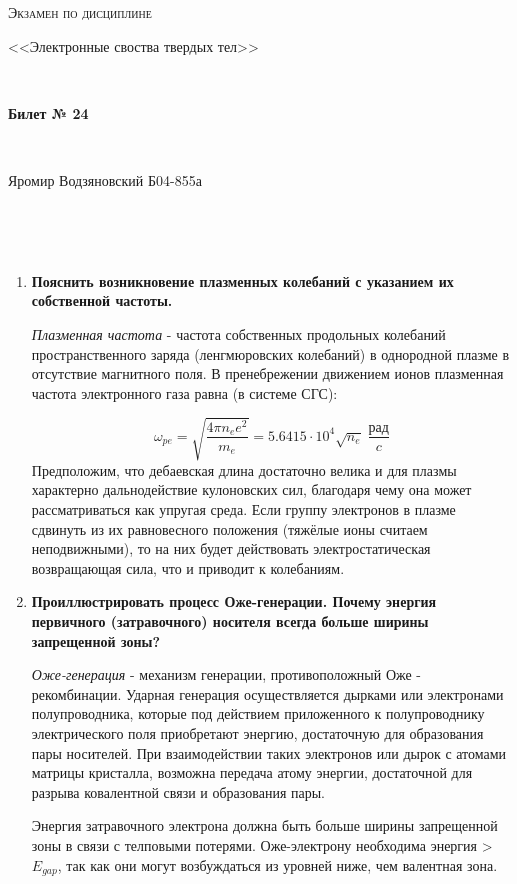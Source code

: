 \documentclass[a4paper]{article}
\begin{document}
\graphicspath{ {pictures/} }
\begin{center}
    {\scshape\Large Экзамен по дисциплине \par <<Электронные своства твердых тел>>} \par

    \

    {\huge\bfseries Билет № 24} \par 

    \

    {\large Яромир Водзяновский Б04-855а}
\end{center}

\

\

\begin{enumerate}
    \item \textbf{Пояснить возникновение плазменных колебаний с указанием их собственной частоты.} \par 
    \textit{Плазменная частота} - частота собственных продольных колебаний пространственного заряда (ленгмюровских колебаний) в однородной плазме в отсутствие магнитного поля. В пренебрежении движением ионов плазменная частота электронного газа равна (в системе СГС): \par 
    $$\omega_{pe} = \sqrt{\frac{4 \pi n_e e^2}{m_e}} = 5.6415 \cdot 10^4 \sqrt{n_e} \; \frac{рад}{c}$$
    Предположим, что дебаевская длина достаточно велика и для плазмы характерно дальнодействие кулоновских сил, благодаря чему она может рассматриваться как упругая среда. Если группу электронов в плазме сдвинуть из их равновесного положения (тяжёлые ионы считаем неподвижными), 
    то на них будет действовать электростатическая возвращающая сила, что и приводит к колебаниям.

    \item \textbf{Проиллюстрировать процесс Оже-генерации. Почему энергия первичного (затравочного) носителя всегда больше ширины запрещенной зоны? } \par 
    \textit{Оже-генерация} - механизм генерации, противоположный Оже - рекомбинации. Ударная генерация осуществляется дырками или электронами полупроводника, которые под действием приложенного к полупроводнику электрического 
    поля приобретают энергию, достаточную для образования пары носителей. При взаимодействии таких электронов или дырок с атомами матрицы кристалла, возможна передача атому энергии, достаточной для разрыва ковалентной связи и образования пары. \par 
    Энергия затравочного электрона должна быть больше ширины запрещенной зоны в связи с телповыми потерями. Оже-электрону необходима энергия > $E_{gap}$, так как они могут возбуждаться из уровней ниже, чем валентная зона.


\end{enumerate}
\end{document}
